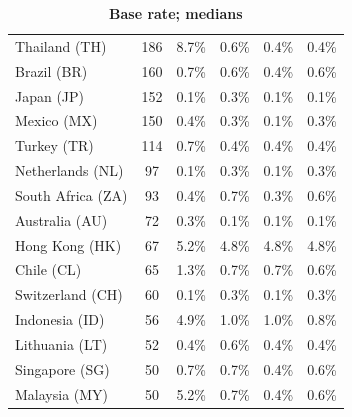 {\begin{table}[ht]
{\begin{tabular}{lccccc}
Thailand (TH)         &   186  & \cellcolor{red5}  8.7\% & \cellcolor{green1} 0.6\% & \cellcolor{green1} 0.4\% & \cellcolor{green1} 0.4\% \\  %
Brazil (BR)           &   160  & \cellcolor{green0} 0.7\% & \cellcolor{green0} 0.6\% & \cellcolor{green0} 0.4\% & \cellcolor{green0} 0.6\% \\  %
Japan (JP)            &   152  & 0.1\% & 0.3\% & 0.1\% & 0.1\% \\  %
Mexico (MX)           &   150  & \cellcolor{green0} 0.4\% & \cellcolor{green0} 0.3\% & \cellcolor{green0} 0.1\% & \cellcolor{green0} 0.3\% \\  %
Turkey (TR)           &   114  & 0.7\% & 0.4\% & 0.4\% & 0.4\% \\  %
Netherlands (NL)      &    97  & \cellcolor{green0} 0.1\% & 0.3\% & \cellcolor{green0} 0.1\% & 0.3\% \\  %
South Africa (ZA)     &    93  & \cellcolor{green0} 0.4\% & 0.7\% & \cellcolor{green0} 0.3\% & \cellcolor{green0} 0.6\% \\  %
Australia (AU)        &    72  & 0.3\% & \cellcolor{green0} 0.1\% & \cellcolor{green0} 0.1\% & \cellcolor{green0} 0.1\% \\  %
Hong Kong (HK)        &    67  & 5.2\% & 4.8\% & 4.8\% & 4.8\% \\  %
Chile (CL)            &    65  & 1.3\% & \cellcolor{green0} 0.7\% & \cellcolor{green0} 0.7\% & \cellcolor{green0} 0.6\% \\  %
Switzerland (CH)      &    60  & \cellcolor{green0} 0.1\% & 0.3\% & \cellcolor{green0} 0.1\% & 0.3\% \\  %
Indonesia (ID)        &    56  & 4.9\% & \cellcolor{green0} 1.0\% & \cellcolor{green0} 1.0\% & \cellcolor{green0} 0.8\% \\  %
Lithuania (LT)        &    52  & 0.4\% & 0.6\% & 0.4\% & 0.4\% \\  %
Singapore (SG)        &    50  & 0.7\% & 0.7\% & \cellcolor{green0} 0.4\% & \cellcolor{green0} 0.6\% \\  %
Malaysia (MY)         &    50  & \cellcolor{red2} 5.2\% & \cellcolor{green0} 0.7\% & \cellcolor{green1} 0.4\% & \cellcolor{green1} 0.6\% \\  %

                \bottomrule
        \end{tabular}
        }
        \caption{\textbf{Base rate; medians}}
    \end{table}
}
 





